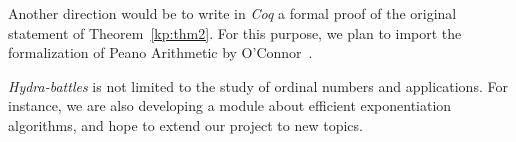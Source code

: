\documentclass{easychair}
\begin{document}
Another direction would be to write in \textit{Coq} a formal proof of the original statement of Theorem~\ref{kp:thm2}. For this purpose, we plan to import  the formalization of Peano Arithmetic by O'Connor~\cite{Goedel}.

 \emph{Hydra-battles} is not limited to the study of ordinal numbers and applications.
 For instance, we are also developing 
a module about efficient exponentiation algorithms, and hope
to extend our project to new topics.




\label{sect:bib}

%
%
%

\end{document}
